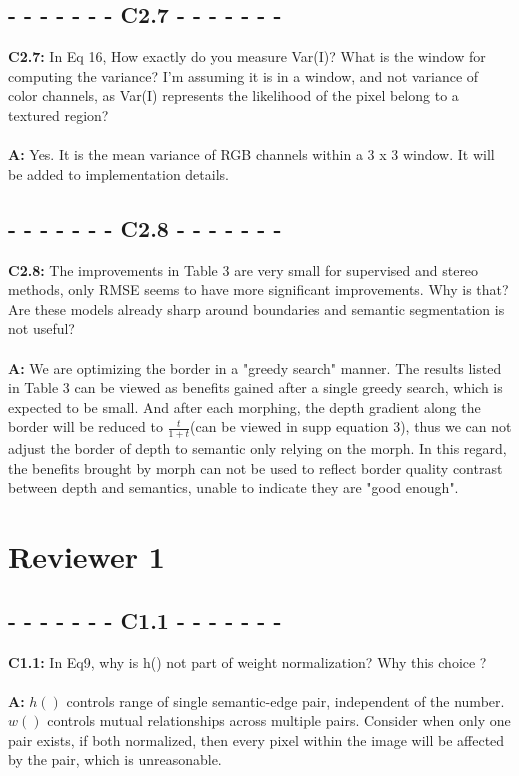\documentclass[10pt,twocolumn,letterpaper]{article}
\begin{document}
\subsection*{- - - - - - - C2.7 - - - - - - -}
\noindent\textbf{C2.7:} In Eq 16, How exactly do you measure Var(I)? What is the window for computing the variance? I'm assuming it is in a window, and not variance of color channels, as Var(I) represents the likelihood of the pixel belong to a textured region? \\ \\
\noindent\textbf{A:} Yes. It is the mean variance of RGB channels within a 3 x 3 window. It will be added to implementation details.
\subsection*{- - - - - - - C2.8 - - - - - - -}
\noindent\textbf{C2.8:} The improvements in Table 3 are very small for supervised and stereo methods, only RMSE seems to have more significant improvements. Why is that? Are these models already sharp around boundaries and semantic segmentation is not useful? \\ \\
\noindent\textbf{A:} We are optimizing the border in a "greedy search" manner. The results listed in Table 3 can be viewed as benefits gained after a single greedy search, which is expected to be small. And after each morphing, the depth gradient along the border will be reduced to $\frac{t}{1 + t}$(can be viewed in supp equation 3), thus we can not adjust the border of depth to semantic only relying on the morph. In this regard, the benefits brought by morph can not be used to reflect border quality contrast between depth and semantics, unable to indicate they are "good enough".
\section*{Reviewer 1}
\subsection*{- - - - - - - C1.1 - - - - - - -}
\noindent\textbf{C1.1:} In Eq9, why is h() not part of weight normalization? Why this choice ? \\ \\
\noindent\textbf{A:} $h()$ controls range of single semantic-edge pair, independent of the number. $w()$ controls mutual relationships across multiple pairs. Consider when only one pair exists, if both normalized, then every pixel within the image will be affected by the pair, which is unreasonable. 
\end{document}
